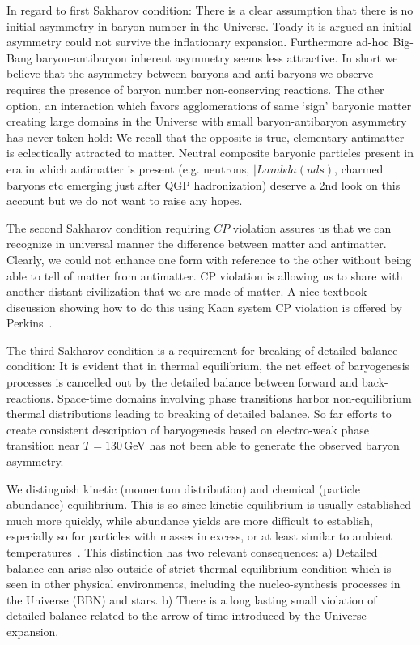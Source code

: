 In regard to first Sakharov condition: There is a clear assumption that there is no initial asymmetry in baryon number in the Universe. Toady it is argued an initial asymmetry could not survive the  inflationary expansion. Furthermore ad-hoc Big-Bang  baryon-antibaryon inherent asymmetry seems less attractive.  In short we believe that the asymmetry between baryons and anti-baryons we observe requires  the presence of baryon number non-conserving reactions. The other option, an interaction which  favors agglomerations of same `sign' baryonic matter creating large domains in the Universe with small baryon-antibaryon asymmetry has never taken hold: We recall that the opposite is true, elementary antimatter is eclectically attracted to matter. Neutral composite baryonic particles present in era in which antimatter is present (e.g. neutrons, $|Lambda(uds)$, charmed baryons etc emerging just after QGP hadronization) deserve a 2nd look on this account but we do not want to raise any hopes. 

The second Sakharov condition requiring $CP$ violation assures us that we can recognize in universal manner the difference between matter and antimatter.  Clearly, we  could not enhance one form with reference to the other without being able to tell  of matter from antimatter.  CP violation is  allowing us to share with another distant civilization that we are made of matter. A nice textbook discussion showing how to do this using Kaon system CP violation is offered by Perkins~\cite{Perkins:1982xb}.

The third  Sakharov condition is a requirement for breaking of detailed balance condition: It is evident that in thermal equilibrium, the net effect of baryogenesis processes is cancelled out by the detailed balance between  forward and back-reactions. Space-time domains involving phase transitions harbor non-equilibrium thermal distributions  leading to breaking of detailed balance. So far efforts to create consistent description of baryogenesis based on electro-weak phase transition near $T=130$\,GeV has not been able to generate the observed baryon asymmetry. 

We distinguish kinetic (momentum distribution) and chemical (particle abundance) equilibrium. This is so since kinetic equilibrium is usually established much more quickly, while abundance yields are more difficult to establish, especially so for particles with masses in excess, or at least similar to ambient temperatures~\cite{Koch:1986ud,Birrell:2014gea}. This distinction has two relevant consequences: a) Detailed balance can arise  also outside of strict thermal equilibrium condition which is seen in other physical environments, including the nucleo-synthesis processes in the Universe (BBN) and stars.  b) There is a long lasting small violation of detailed balance related to the arrow of time introduced by the Universe expansion. 

